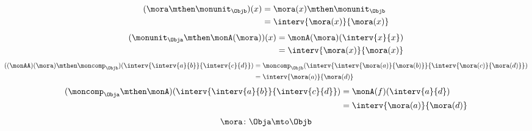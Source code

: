 {\begin{forslides}
\begin{equation}
\begin{aligned}
        \end{aligned}
    \end{equation}
    \begin{equation}
        \label{eq:arrow_1}
        \begin{aligned}
            (\mora \mthen \monunit_\Objb)(x)
             & =\mora(x)\mthen \monunit_\Objb \\
             & =\interv{\mora(x)}{\mora(x)}
        \end{aligned}
    \end{equation}
    \begin{equation}
        \label{eq:arrow_2}
        \begin{aligned}
            (\monunit_\Obja \mthen \monA(\mora))(x)
             & =\monA(\mora)(\interv{x}{x}) \\
             & =\interv{\mora(x)}{\mora(x)}
        \end{aligned}
    \end{equation}
    \begin{equation}
        \label{eq:arrow_3}
        \begin{aligned}
            ((\monAA)(\mora)\mthen \moncomp_\Objb)(\interv{\interv{a}{b}}{\interv{c}{d}}) & =\moncomp_\Objb(\interv{\interv{\mora(a)}{\mora(b)}}{\interv{\mora(c)}{\mora(d)}}) \\
                                                                                          & =\interv{\mora(a)}{\mora(d)}
        \end{aligned}
    \end{equation}
    \begin{equation}
        \label{eq:arrow_4}
        \begin{aligned}
            (\moncomp_\Obja\mthen \monA)(\interv{\interv{a}{b}}{\interv{c}{d}})
             & =\monA(f)(\interv{a}{d}) \\
             & =\interv{\mora(a)}{\mora(d)}
        \end{aligned}
    \end{equation}
    \begin{equation}
        \label{eq:arrow_5}
        \mora\colon \Obja \mto \Objb
    \end{equation}
    
\end{forslides}

}